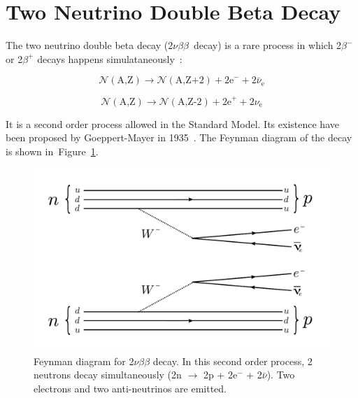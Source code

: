 \documentclass[main.tex]{subfiles}
\begin{document}
\FloatBarrier


\section{Two Neutrino Double Beta Decay}\label{sec:2NeutrinoDBD}


\NI The two neutrino double beta decay (2$\nu\beta\beta$~decay) is a rare process in which 2$\beta^{-}$ or 2$\beta^{+}$ decays happens simulataneously~: 


\begin{equation}
\mathcal{N} (\text{A,Z}) \rightarrow \mathcal{N} (\text{A,Z+2}) + \text{2e}^- + \text{2}\bar{\nu}_{\text{e}} 
\end{equation}

\begin{equation}
\mathcal{N} (\text{A,Z}) \rightarrow \mathcal{N} (\text{A,Z-2}) + \text{2e}^+ + \text{2}\nu_{\text{e}} 
\end{equation}


\bigskip


\NI It is a second order process allowed in the Standard Model. Its existence have been proposed by Goeppert-Mayer in 1935~\cite{GoeppertMayerDoubleBetaDecay}. The Feynman diagram of the decay is shown in~Figure~\ref{2nubbFeynman}.

 
\begin{figure}[h!]
\begin{center}
\includegraphics[scale=0.5]{pictures/Chap2/2nubbFeynmanDiagram_v3.pdf}
\caption{Feynman diagram for 2$\nu\beta\beta$ decay. In this second order process, 2 neutrons decay simultaneously (2n $\rightarrow$ 2p + 2e$^-$ + 2$\bar{\nu}$). Two electrons and two anti-neutrinos are emitted.}
\label{2nubbFeynman}
\end{center}
\end{figure}
\end{document}
